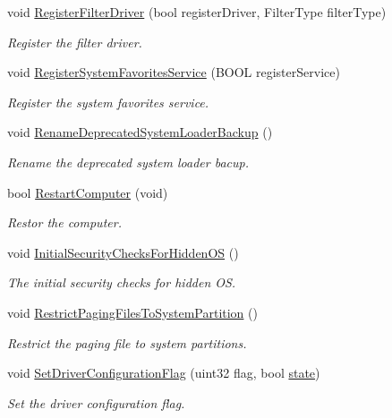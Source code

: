 \begin{DoxyCompactItemize}
void \hyperlink{class_gost_crypt_1_1_boot_encryption_a10d9792ca3396b62332ec244cee983eb}{Register\+Filter\+Driver} (bool register\+Driver, Filter\+Type filter\+Type)
\begin{DoxyCompactList}\small\item\em Register the filter driver. \end{DoxyCompactList}\item 
void \hyperlink{class_gost_crypt_1_1_boot_encryption_a7a5ba170d216844b9ff5db5b6368a0e5}{Register\+System\+Favorites\+Service} (B\+O\+OL register\+Service)
\begin{DoxyCompactList}\small\item\em Register the system favorites service. \end{DoxyCompactList}\item 
void \hyperlink{class_gost_crypt_1_1_boot_encryption_a2cf9147810cf18732e40ccbae474b7be}{Rename\+Deprecated\+System\+Loader\+Backup} ()
\begin{DoxyCompactList}\small\item\em Rename the deprecated system loader bacup. \end{DoxyCompactList}\item 
bool \hyperlink{class_gost_crypt_1_1_boot_encryption_aa8a362642702d24c487f62cd4a109300}{Restart\+Computer} (void)
\begin{DoxyCompactList}\small\item\em Restor the computer. \end{DoxyCompactList}\item 
void \hyperlink{class_gost_crypt_1_1_boot_encryption_af434150f29efc685046c3f92502eeb65}{Initial\+Security\+Checks\+For\+Hidden\+OS} ()
\begin{DoxyCompactList}\small\item\em The initial security checks for hidden OS. \end{DoxyCompactList}\item 
void \hyperlink{class_gost_crypt_1_1_boot_encryption_abb09defd16cb166c11b788d591241571}{Restrict\+Paging\+Files\+To\+System\+Partition} ()
\begin{DoxyCompactList}\small\item\em Restrict the paging file to system partitions. \end{DoxyCompactList}\item 
void \hyperlink{class_gost_crypt_1_1_boot_encryption_a2a42d620e603b2dfe451fd34a361be35}{Set\+Driver\+Configuration\+Flag} (uint32 flag, bool \hyperlink{structstate}{state})
\begin{DoxyCompactList}\small\item\em Set the driver configuration flag. \end{DoxyCompactList}\item 

\end{DoxyCompactItemize}
